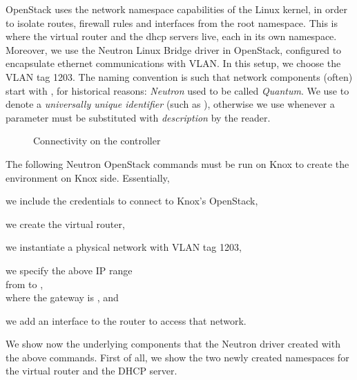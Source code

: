 OpenStack uses the network namespace capabilities of the Linux kernel,
in order to isolate routes, firewall rules and interfaces from the
root namespace.
%
This is where the virtual router and the dhcp servers live, each in
its own namespace.
%
Moreover, we use the Neutron Linux Bridge driver in OpenStack,
configured to encapsulate ethernet communications with VLAN.
%
In this setup, we choose the VLAN tag 1203.
%
The naming convention is such that network components (often) start
with , for historical reasons: \emph{Neutron} used to be
called \emph{Quantum}. We use \codeline{\uuid}
to denote a \emph{universally unique identifier} (such as
), otherwise we use
 whenever a
parameter must be substituted with \emph{description} by the reader.

\begin{figure}[ht]%
  \centering
  
  \caption{Connectivity on the controller}
  \label{figure:connectivity:controller}
\end{figure}


The following Neutron OpenStack commands must be run on Knox
 to create the environment on Knox side.
%
Essentially,
\begin{dazenumerate}
\item we include the credentials to connect to Knox's OpenStack,
\item we create the virtual router,
\item we instantiate a physical network with VLAN tag 1203,
\item we specify the above IP range\\from {} to
  ,\\where the gateway is , and
\item we add an interface to the router to access that network.
\end{dazenumerate}


We show now the underlying components that the Neutron driver created
with the above commands.
%
First of all, we show
the two newly created
namespaces %
for the virtual router and the DHCP server. %

